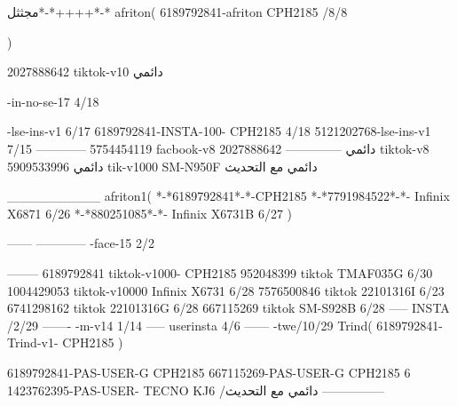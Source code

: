 مجثثل*-*++++*-*
afriton(
6189792841-afriton CPH2185  /8/8

)

2027888642 tiktok-v10
دائمي

-in-no-se-17 4/18

-lse-ins-v1 6/17
6189792841-INSTA-100- CPH2185 4/18
5121202768-lse-ins-v1 7/15
------------
5754454119 facbook-v8
دائمي
--------------
2027888642 tiktok-v8
دائمي
5909533996 tik-v1000  SM-N950F
دائمي مع التحديث

__________
afriton1(
*-*6189792841*-*-CPH2185
*-*7791984522*-*- Infinix X6871  6/26
*-*880251085*-*-  Infinix X6731B  6/27
)


------
------------
-face-15 2/2

--------
6189792841 tiktok-v1000- CPH2185 
952048399 tiktok TMAF035G  6/30
1004429053 tiktok-v10000 Infinix X6731  6/28
7576500846 tiktok 22101316I  6/23
6741298162 tiktok 22101316G  6/28
667115269 tiktok SM-S928B  6/28
-----
 INSTA /2/29
-------
-m-v14 1/14
-----
userinsta 4/6
------
-twe/10/29
Trind(
6189792841-Trind-v1- CPH2185 
)


6189792841-PAS-USER-G CPH2185 
667115269-PAS-USER-G CPH2185 6
1423762395-PAS-USER- TECNO KJ6  /دائمي مع التحديث
    ---------------
